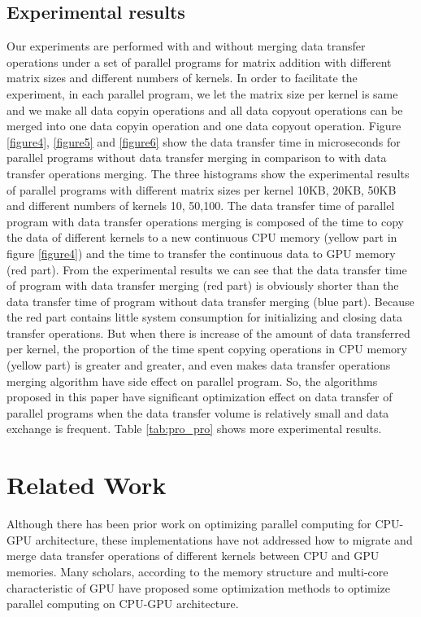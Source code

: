\documentclass[10pt,conference]{IEEEtran}
\begin{document}
\subsection{Experimental results}
Our experiments are performed with and without merging data transfer operations under a set of parallel programs for matrix addition with different matrix sizes and different numbers of kernels. In order to facilitate the experiment, in each parallel program, we let the matrix size per kernel is same and we make all data copyin operations and all data copyout operations can be merged into one data copyin operation and one data copyout operation. Figure \ref{figure4}, \ref{figure5} and \ref{figure6} show the data transfer time in microseconds for parallel programs without data transfer merging in comparison to with data transfer operations merging. The three histograms show the experimental results of parallel programs with different matrix sizes per kernel 10KB, 20KB, 50KB and different numbers of kernels 10, 50,100. The data transfer time of parallel program with data transfer operations merging is composed of the time to copy the data of different kernels to a new continuous CPU memory (yellow part in figure \ref{figure4}) and the time to transfer the continuous data to GPU memory (red part). From the experimental results we can see that the data transfer time of program with data transfer merging (red part) is obviously shorter than the data transfer time of program without data transfer merging (blue part). Because the red part contains little system consumption for initializing and closing data transfer operations. But when there is increase of the amount of data transferred per kernel, the proportion of the time spent copying operations in CPU memory (yellow part) is greater and greater, and even makes data transfer operations merging algorithm have side effect on parallel program. So, the algorithms proposed in this paper have significant optimization effect on data transfer of parallel programs when the data transfer volume is relatively small and data exchange is frequent. Table \ref{tab:pro_pro} shows more experimental results.




\section{Related Work}
Although there has been prior work on optimizing parallel computing for CPU-GPU architecture, these implementations have not addressed how to migrate and merge data transfer operations of different kernels between CPU and GPU memories. Many scholars, according to the memory structure and multi-core characteristic of GPU have proposed some optimization methods to optimize parallel computing on CPU-GPU architecture.
\end{document}
